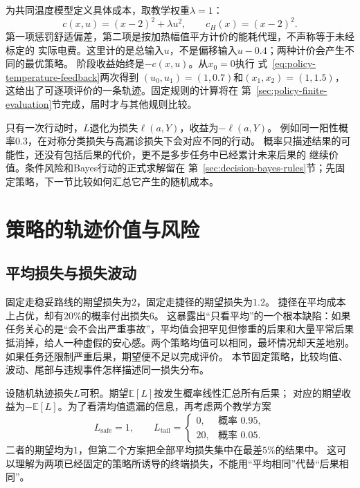 为共同温度模型定义具体成本，取教学权重$\lambda=1$：
\begin{equation}
  c(x,u)=(x-2)^2+\lambda u^2,\qquad c_H(x)=(x-2)^2.
  \label{eq:policy-temperature-cost}
\end{equation}
第一项惩罚舒适偏差，第二项是按加热幅值平方计价的能耗代理，不声称等于未经标定的
实际电费。这里计的是总输入$u$，不是偏移输入$u-0.4$；两种计价会产生不同的最优策略。
阶段收益始终是$-c(x,u)$。从$x_0=0$执行
式~\eqref{eq:policy-temperature-feedback}两次得到
$(u_0,u_1)=(1,0.7)$和$(x_1,x_2)=(1,1.5)$，
这给出了可逐项评价的一条轨迹。固定规则的计算将在
第~\ref{sec:policy-finite-evaluation}节完成，届时才与其他规则比较。

只有一次行动时，$L$退化为损失$\ell(a,Y)$，收益为$-\ell(a,Y)$。
例如同一阳性概率$0.3$，在对称分类损失与高漏诊损失下会对应不同的行动。
概率只描述结果的可能性，还没有包括后果的代价，更不是多步任务中已经累计未来后果的
继续价值。条件风险和Bayes行动的正式求解留在
第~\ref{sec:decision-bayes-rules}节；先固定策略，下一节比较如何汇总它产生的随机成本。

\section{策略的轨迹价值与风险}
\label{sec:decision-risk-criteria-robustness}

\subsection{平均损失与损失波动}

固定走稳妥路线的期望损失为$2$，固定走捷径的期望损失为$1.2$。
捷径在平均成本上占优，却有$20\%$的概率付出损失$6$。
这暴露出“只看平均”的一个根本缺陷：如果任务关心的是“会不会出严重事故”，平均值会把罕见但惨重的后果和大量平常后果抵消掉，给人一种虚假的安心感。两个策略均值可以相同，最坏情况却天差地别。
如果任务还限制严重后果，期望便不足以完成评价。
本节固定策略，比较均值、波动、尾部与违规事件怎样描述同一损失分布。

设随机轨迹损失$L$可积。期望$\mathbb E[L]$按发生概率线性汇总所有后果；
对应的期望收益为$-\mathbb E[L]$。为了看清均值遗漏的信息，再考虑两个教学方案
\[
  L_{\mathrm{safe}}=1,\qquad
  L_{\mathrm{tail}}=
  \begin{cases}
    0,&\text{概率 }0.95,\\
    20,&\text{概率 }0.05.
  \end{cases}
\]
二者的期望均为$1$，但第二个方案把全部平均损失集中在最差$5\%$的结果中。
这可以理解为两项已经固定的策略所诱导的终端损失，不能用“平均相同”代替“后果相同”。

